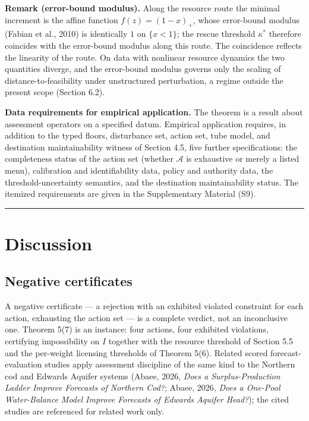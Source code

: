 \documentclass[review,11pt]{elsarticle}
\begin{document}
\textbf{Remark (error-bound modulus).} Along the resource route the minimal increment is the affine function \(f(z) = (1 - x)_+\), whose error-bound modulus (Fabian et al., 2010) is identically \(1\) on \(\{x < 1\}\); the rescue threshold \(\kappa^*\) therefore coincides with the error-bound modulus along this route. The coincidence reflects the linearity of the route. On data with nonlinear resource dynamics the two quantities diverge, and the error-bound modulus governs only the scaling of distance-to-feasibility under unstructured perturbation, a regime outside the present scope (Section 6.2).

\textbf{Data requirements for empirical application.} The theorem is a
result about assessment operators on a specified datum. Empirical
application requires, in addition to the typed floors, disturbance set,
action set, tube model, and destination maintainability witness of
Section 4.5, five further specifications: the completeness status of the
action set (whether \(\mathcal{A}\) is exhaustive or merely a listed
menu), calibration and identifiability data, policy and authority data,
the threshold-uncertainty semantics, and the destination
maintainability status. The itemized requirements are given in the
Supplementary Material (S9).

\begin{center}\rule{0.5\linewidth}{0.5pt}\end{center}

\section{Discussion}\label{discussion}

\subsection{Negative certificates}\label{negative-certificates}

A negative certificate --- a rejection with an exhibited violated constraint for each action, exhausting the action set --- is a complete verdict, not an inconclusive one. Theorem 5(7) is an instance: four actions, four exhibited violations, certifying impossibility on \(I\) together with the resource threshold of Section 5.5 and the per-weight licensing thresholds of Theorem 5(6). Related scored forecast-evaluation studies apply assessment discipline of the same kind to the Northern cod and Edwards Aquifer systems (Abaee, 2026, \emph{Does a Surplus-Production Ladder Improve Forecasts of Northern Cod?}; Abaee, 2026, \emph{Does a One-Pool Water-Balance Model Improve Forecasts of Edwards Aquifer Head?}); the cited studies are referenced for related work only.
\end{document}
